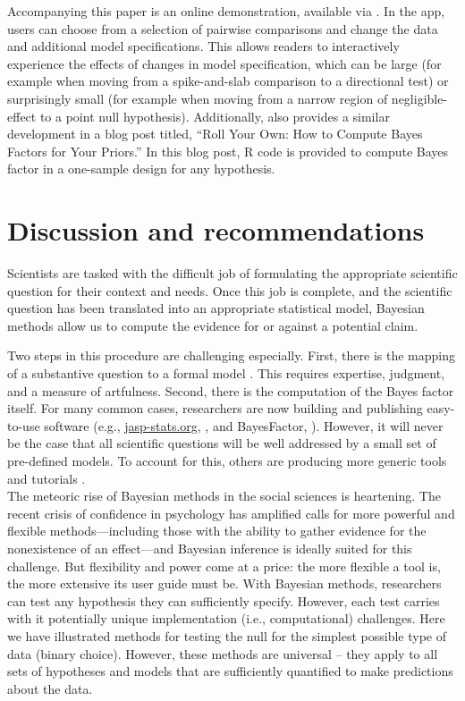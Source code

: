 Accompanying this paper is an online demonstration, available via \osf. In the app, users can choose from a selection of pairwise comparisons and change the data and additional model specifications. This allows readers to interactively experience the effects of changes in model specification, which can be large (for example when moving from a spike-and-slab comparison to a directional test) or surprisingly small (for example when moving from a narrow region of negligible-effect to a point null hypothesis).  Additionally,  also provides a similar development in a blog post titled, ``Roll Your Own: How to Compute Bayes Factors for Your Priors.'' In this blog post, R code is provided to compute Bayes factor in a one-sample design for any hypothesis.

\section*{Discussion and recommendations}

Scientists are tasked with the difficult job of formulating the appropriate scientific question for their context and needs. Once this job is complete, and the scientific question has been translated into an appropriate statistical model, Bayesian methods allow us to compute the evidence for or against a potential claim.

Two steps in this procedure are challenging especially.  First, there is the mapping of a substantive question to a formal model \cite{LeeSI,MatzkeSI,LeeWagenmakersBayesBook,lee2018bayesian}.  This requires expertise, judgment, and a measure of artfulness.  Second, there is the computation of the Bayes factor itself.  For many common cases, researchers are now building and publishing easy-to-use software (e.g., \url{jasp-stats.org}, , and BayesFactor, ).  However, it will never be the case that all scientific questions will be well addressed by a small set of pre-defined models.  To account for this, others are producing more generic tools and tutorials \cite{gronau2018bridge,MatzkeSI,vanravenzwaaijSI}.\\

\noindent The meteoric rise of Bayesian methods in the social sciences is heartening.  The recent crisis of confidence in psychology has amplified calls for more powerful and flexible methods---including those with the ability to gather evidence for the nonexistence of an effect---and Bayesian inference is ideally suited for this challenge.  But flexibility and power come at a price: the more flexible a tool is, the more extensive its user guide must be. With Bayesian methods, researchers can test any hypothesis they can sufficiently specify.  However, each test carries with it potentially unique implementation (i.e., computational) challenges.  Here we have illustrated methods for testing the null for the simplest possible type of data (binary choice).
However, these methods are universal -- they apply to all sets of hypotheses and models that are sufficiently quantified to make predictions about the data.


